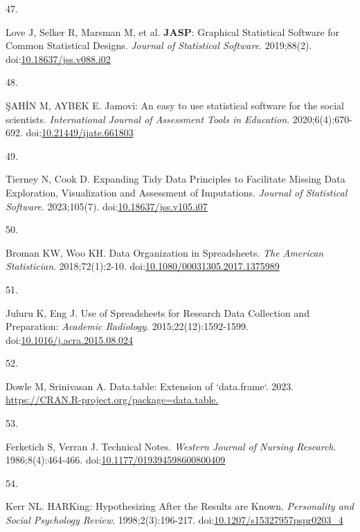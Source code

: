 \documentclass[
]{book}
\newlength{\cslhangindent}
\newlength{\csllabelwidth}
\newlength{\cslentryspacingunit} %
\newenvironment{CSLReferences}[2] %
 {%
  \setlength{\parindent}{0pt}
  \ifodd #1
  \let\oldpar\par
  \def\par{\hangindent=\cslhangindent\oldpar}
  \fi
  \setlength{\parskip}{#2\cslentryspacingunit}
 }%
 {}
\newcommand{\CSLLeftMargin}[1]{\parbox[t]{\csllabelwidth}{#1}}
\newcommand{\CSLRightInline}[1]{\parbox[t]{\linewidth - \csllabelwidth}{#1}\break}
\begin{document}
\begin{CSLReferences}{0}{0}
\leavevmode{}%
\CSLLeftMargin{47. }%
\CSLRightInline{Love J, Selker R, Marsman M, et al. {\textbf{JASP}}: Graphical Statistical Software for Common Statistical Designs. \emph{Journal of Statistical Software}. 2019;88(2). doi:\href{https://doi.org/10.18637/jss.v088.i02}{10.18637/jss.v088.i02}}

\leavevmode{}%
\CSLLeftMargin{48. }%
\CSLRightInline{ŞAHİN M, AYBEK E. Jamovi: An easy to use statistical software for the social scientists. \emph{International Journal of Assessment Tools in Education}. 2020;6(4):670-692. doi:\href{https://doi.org/10.21449/ijate.661803}{10.21449/ijate.661803}}

\leavevmode{}%
\CSLLeftMargin{49. }%
\CSLRightInline{Tierney N, Cook D. Expanding Tidy Data Principles to Facilitate Missing Data Exploration, Visualization and Assessment of Imputations. \emph{Journal of Statistical Software}. 2023;105(7). doi:\href{https://doi.org/10.18637/jss.v105.i07}{10.18637/jss.v105.i07}}

\leavevmode{}%
\CSLLeftMargin{50. }%
\CSLRightInline{Broman KW, Woo KH. Data Organization in Spreadsheets. \emph{The American Statistician}. 2018;72(1):2-10. doi:\href{https://doi.org/10.1080/00031305.2017.1375989}{10.1080/00031305.2017.1375989}}

\leavevmode{}%
\CSLLeftMargin{51. }%
\CSLRightInline{Juluru K, Eng J. Use of Spreadsheets for Research Data Collection and Preparation: \emph{Academic Radiology}. 2015;22(12):1592-1599. doi:\href{https://doi.org/10.1016/j.acra.2015.08.024}{10.1016/j.acra.2015.08.024}}

\leavevmode{}%
\CSLLeftMargin{52. }%
\CSLRightInline{Dowle M, Srinivasan A. Data.table: Extension of `data.frame`. 2023. \href{https://CRAN.R-project.org/package=data.table}{https://CRAN.R-project.org/package=data.table.}}

\leavevmode{}%
\CSLLeftMargin{53. }%
\CSLRightInline{Ferketich S, Verran J. Technical Notes. \emph{Western Journal of Nursing Research}. 1986;8(4):464-466. doi:\href{https://doi.org/10.1177/019394598600800409}{10.1177/019394598600800409}}

\leavevmode{}%
\CSLLeftMargin{54. }%
\CSLRightInline{Kerr NL. HARKing: Hypothesizing After the Results are Known. \emph{Personality and Social Psychology Review}. 1998;2(3):196-217. doi:\href{https://doi.org/10.1207/s15327957pspr0203_4}{10.1207/s15327957pspr0203\_4}}


\end{CSLReferences}
\end{document}
